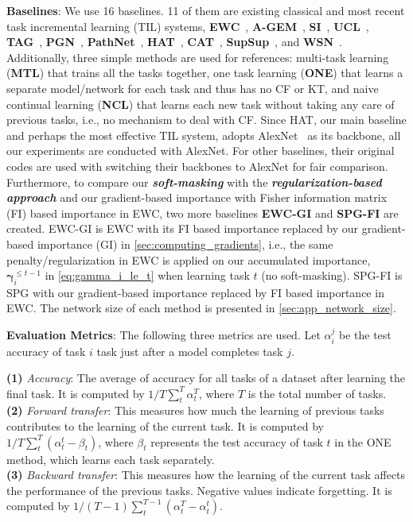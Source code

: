 \textbf{Baselines}:
We use 16 baselines. 11 of them are existing classical and most recent task incremental learning (TIL) systems, \textbf{EWC}~\citep{ewc}, \textbf{A-GEM}~\citep{a-gem},  \textbf{SI}~\citep{si}, \textbf{UCL}~\citep{ucl}, \textbf{TAG}~\citep{tag}, \textbf{PGN}~\citep{pgn}, \textbf{PathNet}~\citep{pathnet}, \textbf{HAT}~\citep{hat}, \textbf{CAT}~\citep{cat}, \textbf{SupSup}~\citep{supsup}, and \textbf{WSN}~\citep{wsn}.
Additionally, three simple methods are used for references: multi-task learning (\textbf{MTL}) that trains all the tasks together,
one task learning (\textbf{ONE}) that learns a separate model/network for each task and thus has no CF or KT,
and naive continual learning (\textbf{NCL})  
that learns each new task without taking any care of previous tasks, i.e., no mechanism to deal with CF. 
Since HAT, our main baseline and perhaps the most effective TIL system, adopts AlexNet~\citep{alexnet} as its backbone, all our experiments are conducted with AlexNet. For other baselines, their original codes are used with switching their backbones to AlexNet for fair comparison. 
Furthermore,
to compare our \textbf{\textit{soft-masking}} with the \textbf{\textit{regularization-based approach}} and our gradient-based importance with Fisher information matrix (FI) based importance in EWC, two more baselines \textbf{EWC-GI} and \textbf{SPG-FI} are created. EWC-GI is EWC with its FI based importance replaced by our gradient-based importance (GI) in \cref{sec:computing_gradients}, i.e., the same penalty/regularization in EWC is applied on our accumulated importance, $\bm{\gamma}_i^{\le t-1}$ in \cref{eq:gamma_i_le_t} when learning task $t$ (no soft-masking). SPG-FI is SPG with our gradient-based importance replaced by FI based importance in EWC. 
The network size of each method is presented in \cref{sec:app_network_size}.







\textbf{Evaluation Metrics}:
The following three metrics are used. Let $\alpha_i^j$ be the test accuracy of task $i$ task just after a model completes task $j$. 

\textbf{(1)} \textit{Accuracy}:
The average of accuracy for all tasks of a dataset after learning the final task. It is computed by $1/T \sum_t^T \alpha_t^T$, where $T$ is the total number of tasks. \\ 
\textbf{(2)} \textit{Forward transfer}:
This measures how much the learning of previous tasks contributes to the learning of the current task. It is computed by $1/T \sum_t^T \left( \alpha_t^t - \beta_t \right)$, where $\beta_t$ represents the test accuracy of task $t$ in the ONE method, which learns each task separately. \\
\textbf{(3)} \textit{Backward transfer}:
This measures how the learning of the current task affects the performance of the previous tasks. Negative values indicate forgetting. It is computed by $1/(T-1) \sum_t^{T-1} \left( \alpha_t^T - \alpha_t^t \right)$.







